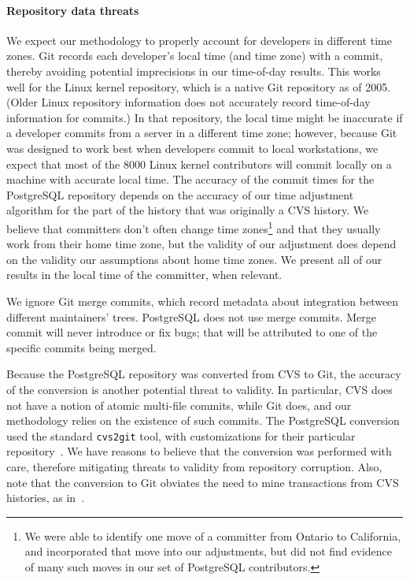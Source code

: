 \paragraph{Repository data threats}

We expect our methodology to properly account for developers in different time
zones. Git records each developer's local time (and time zone) with a commit,
thereby avoiding potential imprecisions in our time-of-day results. This works
well for the Linux kernel repository, which is a native Git repository as of
2005. (Older Linux repository information does not accurately record time-of-day
information for commits.) In that repository, the local time might be inaccurate
if a developer commits from a server in a different time zone; however, because
Git was designed to work best when developers commit to local workstations, we
expect that most of the 8000 Linux kernel contributors will commit locally on a
machine with accurate local time.  The accuracy of the commit times for the
PostgreSQL repository depends on the accuracy of our time adjustment algorithm
for the part of the history that was originally a CVS history. We believe that
committers don't often change time zones\footnote{We were able to identify one
  move of a committer from Ontario to California, and incorporated that move
  into our adjustments, but did not find evidence of many such moves in our set
  of PostgreSQL contributors.} and that they usually work from their home time
zone, but the validity of our adjustment does depend on the validity our
assumptions about home time zones. We present all of our results in the local
time of the committer, when relevant.

We ignore Git merge commits, which record metadata about integration between
different maintainers' trees. PostgreSQL does not use merge commits. Merge
commit will never introduce or fix bugs; that will be attributed to one of the
specific commits being merged.

Because the PostgreSQL repository was converted from CVS to Git, the accuracy of
the conversion is another potential threat to validity.  In particular, CVS does
not have a notion of atomic multi-file commits, while Git does, and our
methodology relies on the existence of such commits. The PostgreSQL conversion
used the standard {\tt cvs2git} tool, with customizations for their particular
repository~\cite{haas09:_so_why_postg_using_git}. We have reasons to believe
that the conversion was performed with care, therefore mitigating threats to
validity from repository corruption.  Also, note that the conversion to Git
obviates the need to mine transactions from CVS histories, as
in~\cite{zimmermann-msr-2004}.

